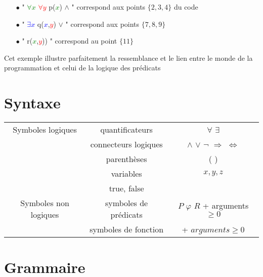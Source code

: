 \begin{itemize}

\item[$\bullet$] " \textcolor{Green}{$\forall x$} \textcolor{Red}{$\forall y$} p(\textcolor{Green}{$x$}) $\wedge$ " correspond aux points $\lbrace 2,3,4 \rbrace$ du code \\

\item[$\bullet$]" \textcolor{Blue}{$\exists x$}  q(\textcolor{Blue}{$x$},\textcolor{Red}{$y$}) $\vee$ " correspond aux points $\lbrace 7,8,9 \rbrace$ \\
 
\item[$\bullet$]" r(\textcolor{Green}{$x$},\textcolor{Red}{$y$})) "  correspond au point $\lbrace 11 \rbrace$ \\

\end{itemize}

Cet exemple illustre parfaitement la ressemblance et le lien entre le monde de la programmation et celui de la logique des prédicats

\section{Syntaxe}

\begin{tabular}{|c|c|c|}
	\hline
	Symboles logiques & quantificateurs & $\forall$ $\exists$ \\
	                  & connecteurs logiques & $\wedge$ $\vee$ $\neg$ $\Rightarrow$ $\Leftrightarrow$ \\
	                  & parenthèses & ( ) \\
	                  & variables & $x, y, z$ \\
	                  & true, false & \\
	\hline
	Symboles non logiques & symboles de prédicats & $P$ $\varphi$ $R$ + arguments $\geq 0$ \\
						  & symboles de fonction & + $arguments \geq 0 $\\
	\hline
\end{tabular}

\section{Grammaire}
